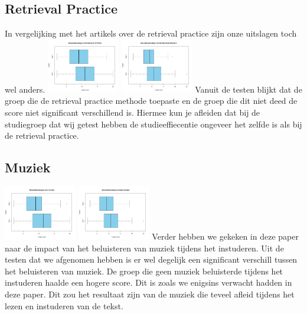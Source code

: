 \documentclass{hogent-article}
\begin{document}
	\subsection{Retrieval Practice}
	In vergelijking met het artikels over de retrieval practice \autocite{butler2010repeated, pyc2012test, karpicke2007repeated, karpicke2008critical} zijn onze uitslagen toch wel anders.
	\includegraphics[width=120px]{Rplot_MetRetrievalPractice}
	\includegraphics[width=120px]{Rplot_ZonderRetrievalPractice}
	Vanuit de testen blijkt dat de groep die de retrieval practice methode toepaste en de groep die dit niet deed de score niet significant verschillend is. Hiermee kun je afleiden dat bij de studiegroep dat wij getest hebben de studieeffiecentie ongeveer het zelfde is als bij de retrieval practice.
	
	\subsection{Muziek}
	\includegraphics[width=120px]{Rplot_MetMuziek}	
	\includegraphics[width=120px]{Rplot_ZonderMuziek}
	Verder hebben we gekeken in deze paper naar de impact van het beluisteren van muziek tijdens het instuderen. Uit de testen dat we afgenomen hebben is er wel degelijk een significant verschill tussen het beluisteren van muziek. De groep die geen muziek beluisterde tijdens het instuderen haalde een hogere score. Dit is zoals we enigsins verwacht hadden in deze paper. Dit zou het resultaat zijn van de muziek die teveel afleid tijdens het lezen en instuderen van de tekst.
	
\end{document}
